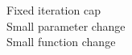 \documentclass[preview]{standalone}
\begin{document}
Fixed iteration cap\\Small parameter change\\Small function change\\
\end{document}
